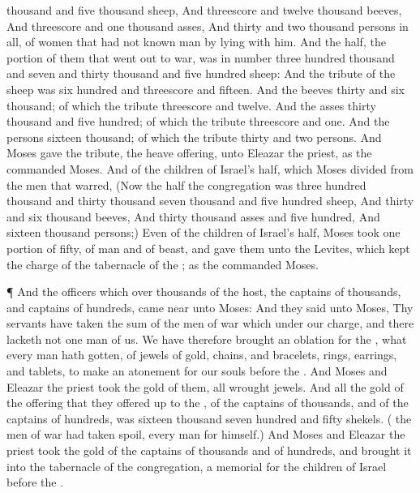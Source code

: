 {thousand and
five
thousand
sheep,
And threescore and
twelve
thousand
beeves,
And
threescore and
one
thousand
asses,
And
thirty and
two
thousand
persons in
all, of
women that had not
known
man by
lying with him.
And the
half,
{} the
portion of them that went
out to
war, was in
number
three
hundred
thousand and
seven and
thirty
thousand and
five
hundred
sheep:
And the
{}
tribute of the
sheep was
six
hundred and threescore and
fifteen.
And the
beeves
{}
thirty and
six
thousand; of which the
{}
tribute
{} threescore and
twelve.
And the
asses
{}
thirty
thousand and
five
hundred; of which the
{}
tribute
{}
threescore and
one.
And the
persons
{}
sixteen
thousand; of which the
{}
tribute
{}
thirty and
two
persons.
And
Moses
gave the
tribute,
{} the
{} heave
offering, unto
Eleazar the
priest, as the
{}
commanded
Moses.
And of the
children of
Israel’s
half, which
Moses
divided from the
men that
warred,
(Now the
half
{} the
congregation was
three
hundred
thousand and
thirty
thousand
{}
seven
thousand and
five
hundred
sheep,
And
thirty and
six
thousand
beeves,
And
thirty
thousand
asses and
five
hundred,
And
sixteen
thousand
persons;)
Even of the
children of
Israel’s
half,
Moses
took
one
portion of
fifty,
{} of
man and of
beast, and
gave them unto the
Levites, which
kept the
charge of the
tabernacle of the
{}; as the
{}
commanded
Moses.
\par }{\PP {}¶ And the
officers which
{} over
thousands of the
host, the
captains of
thousands, and
captains of
hundreds, came
near unto
Moses:
And they
said unto
Moses, Thy
servants have
taken the
sum of the
men of
war which
{} under our
charge, and there
lacketh not one
man of us.
We have therefore
brought an
oblation for the
{}, what every
man hath
gotten, of
jewels of
gold,
chains, and
bracelets,
rings,
earrings, and
tablets, to make an
atonement for our
souls
before the
{}.
And
Moses and
Eleazar the
priest
took the
gold of them,
{} all
wrought
jewels.
And all the
gold of the
offering that they offered
up to the
{}, of the
captains of
thousands, and of the
captains of
hundreds, was
sixteen
thousand
seven
hundred and
fifty
shekels.
({} the
men of
war had taken
spoil, every
man for himself.)
And
Moses and
Eleazar the
priest
took the
gold of the
captains of
thousands and of
hundreds, and
brought it into the
tabernacle of the
congregation,
{} a
memorial for the
children of
Israel
before the
{}.

}
